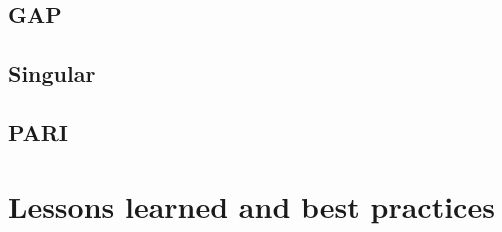 \documentclass{deliverablereport}
\begin{document}
\subsection{GAP}

% 





\subsection{Singular}



\subsection{PARI}


\hypertarget{best-practices}{%
\section{Lessons learned and best practices}\label{best-practices}}
\end{document}
